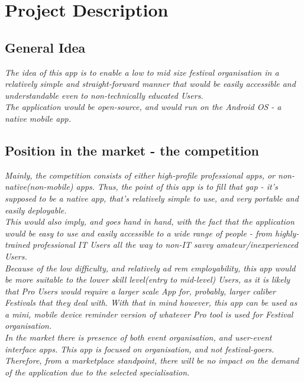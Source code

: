 \chapter{Project Description}

\section{General Idea}
\textit{The idea of this app is to enable a low to mid size festival organisation in a relatively simple and straight-forward manner that would be easily accessible and understandable even to non-technically educated Users.}\\

\textit{The application would be open-source, and would run on the Android OS - a native mobile app.}\\

\section{Position in the market - the competition}
\textit{Mainly, the competition consists of either high-profile professional apps, or non-native(non-mobile) apps. Thus, the point of this app is to fill that gap - it's supposed to be a native app, that's relatively simple to use, and very portable and easily deployable.}\\

\textit{This would also imply, and goes hand in hand, with the fact that the application would be easy to use and easily accessible to a wide range of people - from highly-trained professional IT Users all the way to non-IT savvy amateur/inexperienced Users.}\\

\textit{Because of the low difficulty, and relatively ad rem employability, this app would be more suitable to the lower skill level(entry to mid-level) Users, as it is likely that Pro Users would require a larger scale App for, probably, larger caliber Festivals that they deal with. With that in mind however, this app can be used as a mini, mobile device reminder version of whatever Pro tool is used for Festival organisation.}\\

\textit{In the market there is presence of both event organisation, and user-event interface apps. This app is focused on organisation, and not festival-goers. Therefore, from a marketplace standpoint, there will be no impact on the demand of the application due to the selected specialisation.}\\

